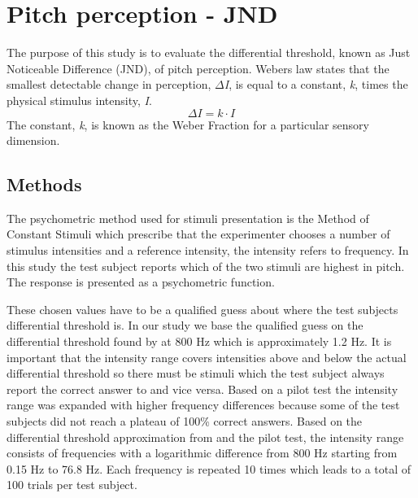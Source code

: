 \chapter*{Pitch perception - JND}
%
The purpose of this study is to evaluate the differential threshold, known as Just Noticeable Difference (JND), of pitch perception. Webers law states that the smallest detectable change in perception, \textit{$\Delta$I}, is equal to a constant, \textit{k}, times the physical stimulus intensity, \textit{I}. 
%
\begin{equation}
\Delta I = k \cdot I
\end{equation}
%
The constant, \textit{k}, is known as the Weber Fraction for a particular sensory dimension.
%

\section*{Methods}
%
The psychometric method used for stimuli presentation is the Method of Constant Stimuli which prescribe that the experimenter chooses a number of stimulus intensities and a reference intensity, the intensity refers to frequency. In this study the test subject reports which of the two stimuli are highest in pitch. The response is presented as a psychometric function. 

These chosen values have to be a qualified guess about where the test subjects differential threshold is. In our study we base the qualified guess on the differential threshold found by \citep{Wier1977} at 800 Hz which is approximately 1.2 Hz. It is important that the intensity range covers intensities above and below the actual differential threshold so there must be stimuli which the test subject always report the correct answer to and vice versa. Based on a pilot test the intensity range was expanded with higher frequency differences because some of the test subjects did not reach a plateau of 100\% correct answers. Based on the differential threshold approximation from \citep{Wier1977} and the pilot test, the intensity range consists of frequencies with a logarithmic difference from 800 Hz starting from 0.15 Hz to 76.8 Hz. Each frequency is repeated 10 times which leads to a total of 100 trials per test subject.  

